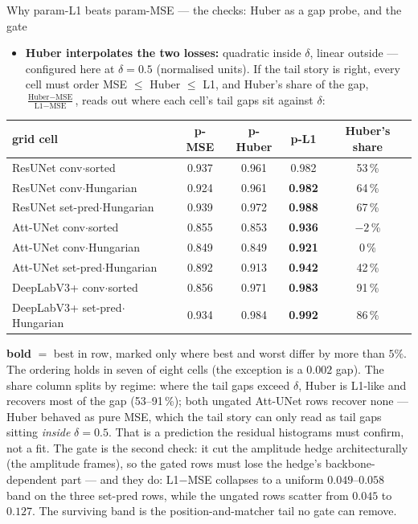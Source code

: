 \begin{frame}{Why param-L1 beats param-MSE --- the checks: Huber as a gap probe, and the gate}
  \small
  \begin{itemize}
    \item \textbf{Huber interpolates the two losses:} quadratic inside
          $\delta$, linear outside --- configured here at $\delta = 0.5$
          (normalised units). If the tail story is right, every cell must
          order MSE $\le$ Huber $\le$ L1, and Huber's share of the gap,
          $\frac{\text{Huber}-\text{MSE}}{\text{L1}-\text{MSE}}$, reads
          out where each cell's tail gaps sit against $\delta$:
  \end{itemize}
  \begin{center}
  \scriptsize
  \renewcommand{\arraystretch}{1.15}
  \setlength{\tabcolsep}{6pt}
  \begin{tabular}{@{}lcccc@{}}
    \toprule
    grid cell & p-MSE & p-Huber & p-L1 & Huber's share \\
    \midrule
    ResUNet conv$\cdot$sorted           & 0.937 & 0.961 & 0.982 & 53\,\% \\
    ResUNet conv$\cdot$Hungarian        & 0.924 & 0.961 & \textbf{0.982} & 64\,\% \\
    ResUNet set-pred$\cdot$Hungarian    & 0.939 & 0.972 & \textbf{0.988} & 67\,\% \\
    Att-UNet conv$\cdot$sorted          & 0.855 & 0.853 & \textbf{0.936} & $-2$\,\% \\
    Att-UNet conv$\cdot$Hungarian       & 0.849 & 0.849 & \textbf{0.921} & 0\,\% \\
    Att-UNet set-pred$\cdot$Hungarian   & 0.892 & 0.913 & \textbf{0.942} & 42\,\% \\
    DeepLabV3+ conv$\cdot$sorted        & 0.856 & 0.971 & \textbf{0.983} & 91\,\% \\
    DeepLabV3+ set-pred$\cdot$Hungarian & 0.934 & 0.984 & \textbf{0.992} & 86\,\% \\
    \bottomrule
  \end{tabular}
  \end{center}
  {\scriptsize \textbf{bold} $=$ best in row, marked only where best and worst
  differ by more than $5\%$. The ordering holds in seven of eight cells (the exception is
  a $0.002$ gap). The share column splits by regime: where the tail gaps
  exceed $\delta$, Huber is L1-like and recovers most of the gap
  (53--91\,\%); both ungated Att-UNet rows recover none --- Huber behaved as
  pure MSE, which the tail story can only read as tail gaps sitting
  \emph{inside} $\delta = 0.5$. That is a prediction the residual histograms
  must confirm, not a fit. The gate is the second check: it cut the
  amplitude hedge architecturally (the amplitude frames), so the gated rows must lose
  the hedge's backbone-dependent part --- and they do: L1$-$MSE collapses to
  a uniform $0.049$--$0.058$ band on the three set-pred rows, while the
  ungated rows scatter from $0.045$ to $0.127$. The surviving band is the
  position-and-matcher tail no gate can remove.\par}
\end{frame}

